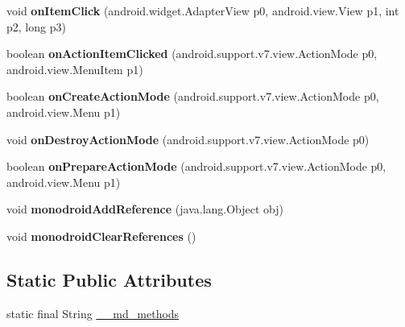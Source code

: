 \begin{DoxyCompactItemize}
void {\bfseries on\+Item\+Click} (android.\+widget.\+Adapter\+View p0, android.\+view.\+View p1, int p2, long p3)
\item 
\mbox{\label{classmd5b60ffeb829f638581ab2bb9b1a7f4f3f_1_1CellAdapter_a49e5cfeb93c21213d2f7962e65898a5e}} 
boolean {\bfseries on\+Action\+Item\+Clicked} (android.\+support.\+v7.\+view.\+Action\+Mode p0, android.\+view.\+Menu\+Item p1)
\item 
\mbox{\label{classmd5b60ffeb829f638581ab2bb9b1a7f4f3f_1_1CellAdapter_af5577bc64f0be210f22a89792a8be639}} 
boolean {\bfseries on\+Create\+Action\+Mode} (android.\+support.\+v7.\+view.\+Action\+Mode p0, android.\+view.\+Menu p1)
\item 
\mbox{\label{classmd5b60ffeb829f638581ab2bb9b1a7f4f3f_1_1CellAdapter_a8d6a0075be883243c54327d203a8d575}} 
void {\bfseries on\+Destroy\+Action\+Mode} (android.\+support.\+v7.\+view.\+Action\+Mode p0)
\item 
\mbox{\label{classmd5b60ffeb829f638581ab2bb9b1a7f4f3f_1_1CellAdapter_aba7bba2fe00d346e064e9ff1f742296f}} 
boolean {\bfseries on\+Prepare\+Action\+Mode} (android.\+support.\+v7.\+view.\+Action\+Mode p0, android.\+view.\+Menu p1)
\item 
\mbox{\label{classmd5b60ffeb829f638581ab2bb9b1a7f4f3f_1_1CellAdapter_a59b12b00e8c034309892498bbef078d4}} 
void {\bfseries monodroid\+Add\+Reference} (java.\+lang.\+Object obj)
\item 
\mbox{\label{classmd5b60ffeb829f638581ab2bb9b1a7f4f3f_1_1CellAdapter_aad3dc816719d492f2fa5de60860e45e7}} 
void {\bfseries monodroid\+Clear\+References} ()
\end{DoxyCompactItemize}
\subsection*{Static Public Attributes}
\begin{DoxyCompactItemize}
\item 
static final String \hyperlink{classmd5b60ffeb829f638581ab2bb9b1a7f4f3f_1_1CellAdapter_abe33e45a7b887b1383f9c0ebda43ef00}{\+\_\+\+\_\+md\+\_\+methods}
\end{DoxyCompactItemize}
